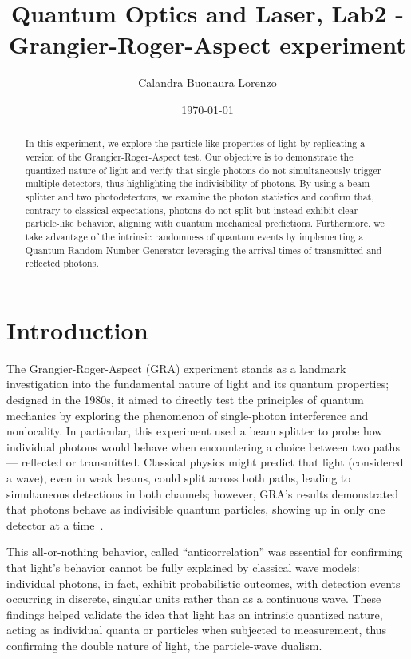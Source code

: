 \documentclass[prl,twocolumn]{revtex4-1}
\begin{document}
\title{Quantum Optics and Laser, Lab2 - Grangier-Roger-Aspect experiment}



\author{Calandra Buonaura Lorenzo}

\date{\today}


\begin{abstract}

In this experiment, we explore the particle-like properties of light by replicating a version of the Grangier-Roger-Aspect test. Our objective is to demonstrate the quantized nature of light and verify that single photons do not simultaneously trigger multiple detectors, thus highlighting the indivisibility of photons. By using a beam splitter and two photodetectors, we examine the photon statistics and confirm that, contrary to classical expectations, photons do not split but instead exhibit clear particle-like behavior, aligning with quantum mechanical predictions. Furthermore, we take advantage of the intrinsic randomness of quantum events by implementing a Quantum Random Number Generator leveraging the arrival times of transmitted and reflected photons.
\end{abstract}

\maketitle

\section{Introduction}
The Grangier-Roger-Aspect (GRA) experiment stands as a landmark investigation into the fundamental nature of light and its quantum properties; designed in the 1980s, it aimed to directly test the principles of quantum mechanics by exploring the phenomenon of single-photon interference and nonlocality. In particular, this experiment used a beam splitter to probe how individual photons would behave when encountering a choice between two paths — reflected or transmitted. Classical physics might predict that light (considered a wave), even in weak beams, could split across both paths, leading to simultaneous detections in both channels; however, GRA’s results demonstrated that photons behave as indivisible quantum particles, showing up in only one detector at a time~\cite{pap1}. 

This all-or-nothing behavior, called ``anticorrelation'' was essential for confirming that light’s behavior cannot be fully explained by classical wave models: individual photons, in fact, exhibit probabilistic outcomes, with detection events occurring in discrete, singular units rather than as a continuous wave. These findings helped validate the idea that light has an intrinsic quantized nature, acting as individual quanta or particles when subjected to measurement, thus confirming the double nature of light, the particle-wave dualism.
\end{document}
